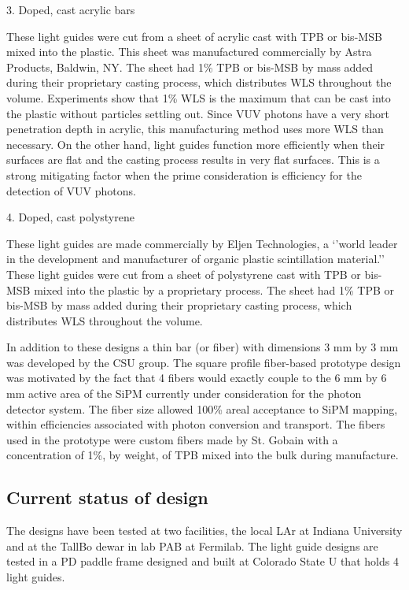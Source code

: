 3.  Doped, cast acrylic bars

These light guides were cut from a sheet of acrylic cast with TPB or bis-MSB mixed into the plastic. This sheet was manufactured commercially by Astra Products, Baldwin, NY.  The sheet had 1\% TPB or bis-MSB by mass added during their proprietary casting process, which distributes WLS throughout the volume.  Experiments show that 1\% WLS is the maximum that can be cast into the plastic without particles settling out.  Since VUV photons have a very short penetration depth in acrylic, this manufacturing method uses more WLS than necessary.  On the other hand, light guides function more efficiently when their surfaces are flat and the casting process results in very flat surfaces.  This is a strong mitigating factor when the prime consideration is efficiency for the detection of VUV photons. 

4.  Doped, cast polystyrene

These light guides are made commercially by Eljen Technologies, a `'world leader in the development and manufacturer of organic plastic scintillation material.''  These light guides were cut from a sheet of polystyrene cast with TPB or bis-MSB mixed into the plastic by a proprietary process.  The sheet had 1\% TPB or bis-MSB by mass added during their proprietary casting process, which distributes WLS throughout the volume. 
 
In addition to these designs a thin bar (or fiber) with dimensions 3 mm by 3 mm was developed by the CSU group. The square profile fiber-based prototype design was motivated by the fact that 4 fibers would exactly couple to the 6 mm by 6 mm active area of the SiPM currently under consideration for the photon detector system. The fiber size allowed 100\% areal acceptance to SiPM mapping, within efficiencies associated with photon conversion and transport. The fibers used in the prototype were custom fibers made by St. Gobain with a concentration of 1\%, by weight, of TPB mixed into the bulk during manufacture.   

\subsection{Current status of design}

The designs have been tested at two facilities, the local LAr at Indiana University and at the TallBo dewar in lab PAB at Fermilab.  The light guide designs are tested in a PD paddle frame designed and built at Colorado State U that holds 4 light guides.  

